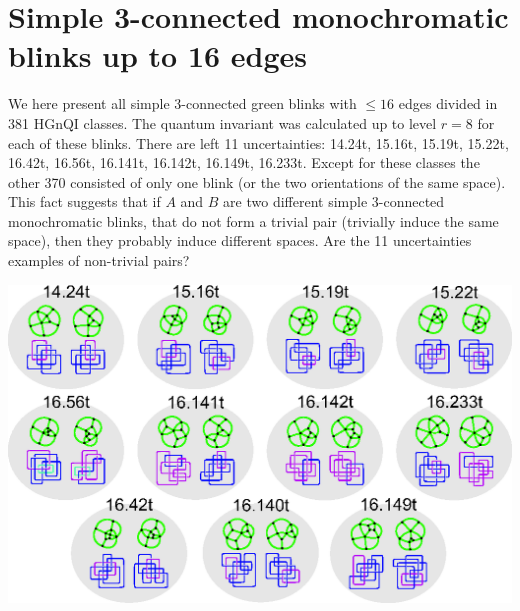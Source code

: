 \chapter{Simple 3-connected monochromatic blinks up to 16 edges}
\label{chap:catalolgue3con}

We here present all simple 3-connected green blinks with
$\leq 16$ edges divided in 381 HGnQI classes. The quantum
invariant was calculated up to level $r=8$ for each of
these blinks. There are left 11 uncertainties: 14.24t,
15.16t, 15.19t, 15.22t, 16.42t, 16.56t, 16.141t, 16.142t,
16.149t, 16.233t. Except for these classes the other 370
consisted of only one blink (or the two orientations of
the same space). This fact suggests that if $A$ and $B$
are two different simple 3-connected monochromatic blinks,
that do not form a trivial pair (trivially induce the
same space), then they probably induce different spaces.
Are the 11 uncertainties examples of non-trivial pairs?

\begin{center}
\includegraphics{A.figs/doubts3connectedisolated.eps}
\end{center}

\newcount\ii \newcount\jj   %
\def\producePagesThree#1#2{
\ii=#1                      %
\jj=#2                      %
\advance\jj by 1            %
\loop   %
   \ifnum\ii<\jj
{
   \hspace{-1.8cm}
   \enlargethispage{5cm}
   {\centering
   \texttt{[image: A.figs/con3catalog\\ifnum\\ii<100 0\\fi\\ifnum\\ii<10 0\\fi\\number\\ii.eps]}
   }
   \newpage}
      \advance\ii by 1
   \repeat
}

